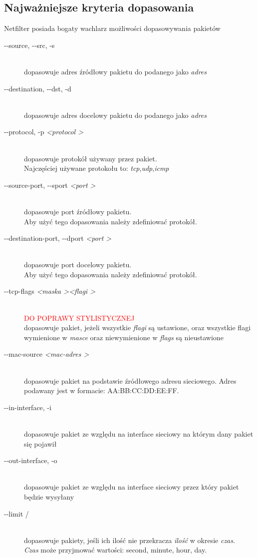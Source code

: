 		\subsection{Najważniejsze kryteria dopasowania}
			Netfilter posiada bogaty wachlarz możliwości dopasowywania pakietów
			\begin{description}
				\item[-{}-source, -{}-src, -s  ] \hfill \\
					dopasowuje adres źródłowy pakietu do podanego jako \textit{adres}
				\item[-{}-destination, -{}-dst, -d ] \hfill\\
					dopasowuje adres docelowy pakietu do podanego jako \textit{adres}
				\item[-{}-protocol, -p \textit{\textless protocol \textgreater}] \hfill \\
					dopasowuje protokół używany przez pakiet.\\
					Najczęściej używane protokołu to: \textit{tcp},\textit{udp},\textit{icmp}
				\item[-{}-source-port, -{}-sport \textit{\textless port \textgreater} ]\hfill\\
					dopasowuje port źródłowy pakietu.\\
					Aby użyć tego dopasowania należy zdefiniować protokół.
				\item[-{}-destination-port, -{}-dport \textit{\textless port \textgreater}] \hfill \\
					dopasowuje port docelowy pakietu.\\
					Aby użyć tego dopasowania należy zdefiniować protokół.
				\item[-{}-tcp-flags \textit{\textless maska \textgreater \textless flagi \textgreater}] \hfill \\
					\textcolor{red}{\Large{DO POPRAWY STYLISTYCZNEJ}}\\
					dopasowuje pakiet, jeżeli wszystkie \textit{flagi} są ustawione, oraz wszystkie flagi wymienione w \textit{masce} oraz niewymienione w \textit{flags} są nieustawione
				\item[-{}-mac-source \textit{\textless mac-adres \textgreater}] \hfill \\
					dopasowuje pakiet na podstawie źródłowego adresu sieciowego. Adres podawany jest w formacie: AA:BB:CC:DD:EE:FF.
				\item[-{}-in-interface, -i ] \hfill \\
					dopasowuje pakiet ze względu na interface sieciowy na którym dany pakiet się pojawił	
				\item[-{}-out-interface, -o ] \hfill \\
					dopasowuje pakiet ze względu na interface sieciowy przez który pakiet będzie wysyłany
				\item[-{}-limit /] \hfill \\
					dopasowuje pakiety, jeśli ich ilość nie przekracza \textit{ilość} w okresie \textit{czas}.\\
					\textit{Czas} może przyjmować wartości: second, minute, hour, day.
			\end{description}

